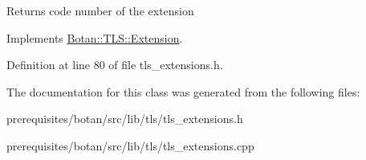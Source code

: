 \begin{DoxyReturn}{Returns}
code number of the extension 
\end{DoxyReturn}


Implements \mbox{\hyperlink{class_botan_1_1_t_l_s_1_1_extension_ac8819b312ce604453225e7b4f7c373ec}{Botan\+::\+T\+L\+S\+::\+Extension}}.



Definition at line 80 of file tls\+\_\+extensions.\+h.



The documentation for this class was generated from the following files\+:\begin{DoxyCompactItemize}
\item 
prerequisites/botan/src/lib/tls/tls\+\_\+extensions.\+h\item 
prerequisites/botan/src/lib/tls/tls\+\_\+extensions.\+cpp\end{DoxyCompactItemize}
